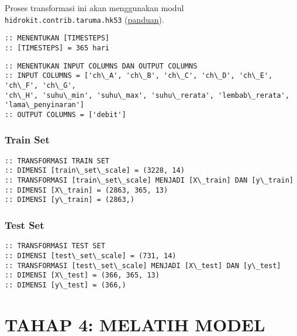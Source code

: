 \documentclass[11pt]{article}
\let\oldsection\section
\renewcommand\section{\clearpage\oldsection}
\begin{document}
Proses transformasi ini akan menggunakan modul
\texttt{hidrokit.contrib.taruma.hk53}
(\href{https://nbviewer.jupyter.org/gist/taruma/50460ebfaab5a30c41e7f1a1ac0853e2}{panduan}).

    \begin{Verbatim}[commandchars=\\\{\}]
:: MENENTUKAN [TIMESTEPS]
:: [TIMESTEPS] = 365 hari
    \end{Verbatim}

    \begin{Verbatim}[commandchars=\\\{\}]
:: MENENTUKAN INPUT COLUMNS DAN OUTPUT COLUMNS
:: INPUT COLUMNS = ['ch\_A', 'ch\_B', 'ch\_C', 'ch\_D', 'ch\_E', 'ch\_F', 'ch\_G',
'ch\_H', 'suhu\_min', 'suhu\_max', 'suhu\_rerata', 'lembab\_rerata',
'lama\_penyinaran']
:: OUTPUT COLUMNS = ['debit']
    \end{Verbatim}

    \hypertarget{train-set}{%
\subsubsection{Train Set}\label{train-set}}

    \begin{Verbatim}[commandchars=\\\{\}]
:: TRANSFORMASI TRAIN SET
:: DIMENSI [train\_set\_scale] = (3228, 14)
:: TRANSFORMASI [train\_set\_scale] MENJADI [X\_train] DAN [y\_train]
:: DIMENSI [X\_train] = (2863, 365, 13)
:: DIMENSI [y\_train] = (2863,)
    \end{Verbatim}

    \hypertarget{test-set}{%
\subsubsection{Test Set}\label{test-set}}

    \begin{Verbatim}[commandchars=\\\{\}]
:: TRANSFORMASI TEST SET
:: DIMENSI [test\_set\_scale] = (731, 14)
:: TRANSFORMASI [test\_set\_scale] MENJADI [X\_test] DAN [y\_test]
:: DIMENSI [X\_test] = (366, 365, 13)
:: DIMENSI [y\_test] = (366,)
    \end{Verbatim}

    \hypertarget{tahap-4-melatih-model}{%
\section{TAHAP 4: MELATIH MODEL}\label{tahap-4-melatih-model}}
\end{document}
